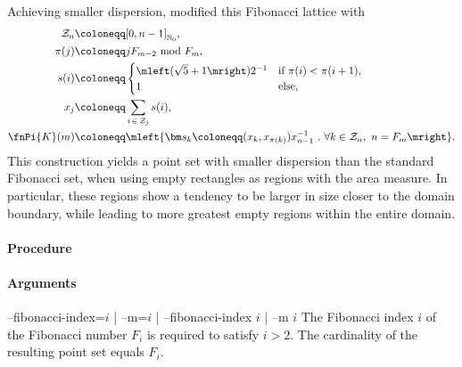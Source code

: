 
Achieving smaller dispersion,  modified this Fibonacci lattice with
\begin{align*}
  \mathcal Z_n &\coloneqq [0, n-1]_{\mathbb N_0}, \\
  \pi(j) &\coloneqq j F_{m-2}\ \text{mod}\ F_m, \\
  s(i) &\coloneqq \begin{cases}
    \mleft(\sqrt{5}+1\mright)2^{-1} & \text{if}\ \pi(i) < \pi(i+1), \\
    1 & \text{else},
  \end{cases} \\
  x_j &\coloneqq \sum_{i\,\in\,\mathcal Z_j} s(i), \\
  \fnPi{K}(m) &\coloneqq \mleft\{ \bm s_k \coloneqq (x_k, x_{\pi(k)}) x_{n-1}^{-1}\ .\ \forall k \in \mathcal Z_n,\ n = F_m \mright\}.
\end{align*}
This construction yields a point set with smaller dispersion than the standard Fibonacci set, when using empty rectangles as regions with the area measure. In particular, these regions show a tendency to be larger in size closer to the domain boundary, while leading to more greatest empty regions within the entire domain.


\paragraph{Procedure}

\begin{synopsis}
\end{synopsis}

\paragraph{Arguments}

\begin{procarg}{--fibonacci-index=$i$ | --m=$i$ | --fibonacci-index $i$ | --m $i$}
  The Fibonacci index $i$ of the Fibonacci number $F_i$ is required to satisfy $i > 2$. The cardinality of the resulting point set equals $F_i$.
\end{procarg}

